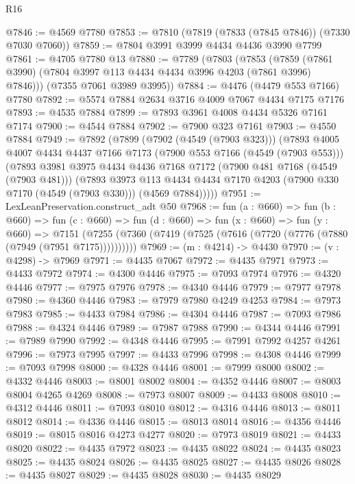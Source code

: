 \begin{lexlean}{R16}
\begin{coremodule}
@7846 := @4569 @7780
@7853 := @7810 (@7819 (@7833 (@7845 @7846)) (@7330 @7030 @7060))
@7859 := @7804 @3991 @3999 @4434 @4436 @3990 @7799
@7861 := @4705 @7780 @13
@7880 := @7789
    (@7803
      (@7853 (@7859 (@7861 @3990) (@7804 @3997 @113 @4434 @4434 @3996 @4203 (@7861 @3996) @7846)))
      (@7355 @7061 @3989 @3995))
@7884 := @4476 (@4479 @553 @7166) @7780
@7892 := @5574 @7884 @2634 @3716 @4009 @7067 @4434 @7175 @7176
@7893 := @4535 @7884
@7899 := @7893 @3961 @4008 @4434 @5326 @7161 @7174
@7900 := @4544 @7884
@7902 := @7900 @323 @7161
@7903 := @4550 @7884
@7949 := @7892
    (@7899
      (@7902 (@4549 (@7903 @323)))
      (@7893
        @4005
        @4007
        @4434
        @4437
        @7166
        @7173
        (@7900 @553 @7166 (@4549 (@7903 @553)))
        (@7893
          @3981
          @3975
          @4434
          @4436
          @7168
          @7172
          (@7900 @481 @7168 (@4549 (@7903 @481)))
          (@7893
            @3973
            @113
            @4434
            @4434
            @7170
            @4203
            (@7900 @330 @7170 (@4549 (@7903 @330)))
            (@4569 @7884)))))
@7951 := LexLeanPreservation.construct_adt @50
@7968 := fun (a : @660) =>
  fun (b : @660) =>
  fun (c : @660) =>
  fun (d : @660) =>
  fun (x : @660) =>
  fun (y : @660) =>
  @7151 (@7255 (@7360 (@7419 (@7525 (@7616 (@7720 (@7776 (@7880 (@7949 (@7951 @7175))))))))))
@7969 := (m : @4214) -> @4430
@7970 := (v : @4298) -> @7969
@7971 := @4435 @7067
@7972 := @4435 @7971
@7973 := @4433 @7972
@7974 := @4300 @4446
@7975 := @7093 @7974
@7976 := @4320 @4446
@7977 := @7975 @7976
@7978 := @4340 @4446
@7979 := @7977 @7978
@7980 := @4360 @4446
@7983 := @7979 @7980 @4249 @4253
@7984 := @7973 @7983
@7985 := @4433 @7984
@7986 := @4304 @4446
@7987 := @7093 @7986
@7988 := @4324 @4446
@7989 := @7987 @7988
@7990 := @4344 @4446
@7991 := @7989 @7990
@7992 := @4348 @4446
@7995 := @7991 @7992 @4257 @4261
@7996 := @7973 @7995
@7997 := @4433 @7996
@7998 := @4308 @4446
@7999 := @7093 @7998
@8000 := @4328 @4446
@8001 := @7999 @8000
@8002 := @4332 @4446
@8003 := @8001 @8002
@8004 := @4352 @4446
@8007 := @8003 @8004 @4265 @4269
@8008 := @7973 @8007
@8009 := @4433 @8008
@8010 := @4312 @4446
@8011 := @7093 @8010
@8012 := @4316 @4446
@8013 := @8011 @8012
@8014 := @4336 @4446
@8015 := @8013 @8014
@8016 := @4356 @4446
@8019 := @8015 @8016 @4273 @4277
@8020 := @7973 @8019
@8021 := @4433 @8020
@8022 := @4435 @7972
@8023 := @4435 @8022
@8024 := @4435 @8023
@8025 := @4435 @8024
@8026 := @4435 @8025
@8027 := @4435 @8026
@8028 := @4435 @8027
@8029 := @4435 @8028
@8030 := @4435 @8029

\end{coremodule}
\end{lexlean}
